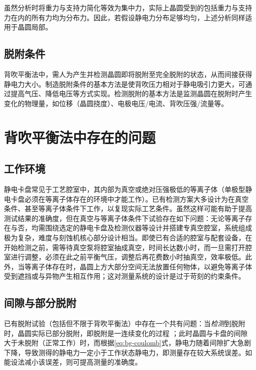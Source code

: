 虽然分析时将重力与支持力简化等效为集中力，实际上晶圆受到的包括重力与支持力在内的所有力均为分布力。因此，若假设静电力分布足够均匀，上述分析同样适用于晶圆局部。


\subsection{脱附条件}\label{sec:principle-backside-dechuck}

背吹平衡法中，需人为产生并检测晶圆即将脱附至完全脱附的状态，从而间接获得静电力大小。制造脱附条件的基本方法是使背吹压力相对于静电吸引力更大，可通过提高气压、降低电压等方式实现。检测脱附的基本方法是监测晶圆在脱附时产生变化的物理量，如位移（晶圆挠度）、电极电压/电流、背吹压强/流量等。



\clearpage



\section{背吹平衡法中存在的问题}\label{sec:principle-prob}


\subsection{工作环境}\label{sec:principle-prob-env}

静电卡盘常见于工艺腔室中，其内部为真空或绝对压强极低的等离子体（单极型静电卡盘必须在等离子体存在的环境中才能工作）。已有检测方案大多设计为在真空条件、甚至等离子体条件下工作，以复现实际工艺条件。虽然这样可能有助于提高测试结果的准确度，但在真空与等离子体条件下试验存在如下问题：无论等离子存在与否，均需围绕选定的静电卡盘及检测仪器等设计并搭建专真空腔室，系统组成极为复杂，难度与刻蚀机核心部分设计相当。即使已有合适的腔室与配套设备，在开始检测之前，需等待真空泵将腔室抽成真空，时间长达数小时，而一旦需打开腔室进行调整，必须在此之前平衡气压，调整后再花费数小时抽真空，效率极低。此外，当等离子体存在时，晶圆上方大部分空间无法放置任何物体，以避免等离子体受到遮挡或与异物产生相互作用；这对测量系统的设计是过于苛刻的约束条件。


\subsection{间隙与部分脱附}\label{principle-prob-gap}

已有脱附试验（包括但不限于背吹平衡法）中存在一个共有问题：当\emph{检测}到脱附时，晶圆实际已部分脱附，即脱附是一连续变化的过程
；此时晶圆与卡盘的间隙大于未脱附（正常工作）时，而根据\eqref{eq:bg-coulomb}式，静电力随着间隙扩大急剧下降，导致测得的静电力一定小于工作状态静电力，即测量存在较大系统误差。如能设法减小该误差，则可提高测量的准确度。

